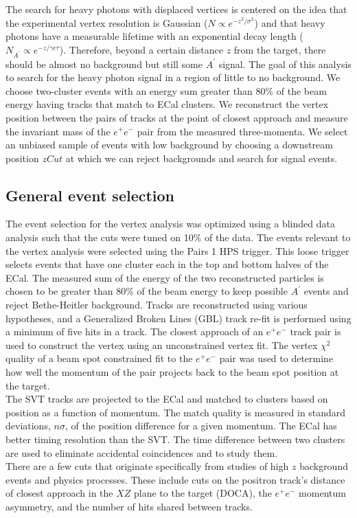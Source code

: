 The search for heavy photons with displaced vertices is centered on the idea that the experimental vertex resolution is Gaussian ($N\propto e^{-z^2/\sigma^2}$) and that heavy photons have a measurable lifetime with an exponential decay length ($N_{A^{\prime}}\propto e^{-z/\gamma c\tau}$). Therefore, beyond a certain distance $z$ from the target, there should be almost no background but still some $A^{\prime}$ signal. The goal of this analysis to search for the heavy photon signal in a region of little to no background. We choose two-cluster events with an energy sum greater than 80$\%$ of the beam energy having tracks that match to ECal clusters. We reconstruct the vertex position between the pairs of tracks at the point of closest approach and measure the invariant mass of the $e^+e^-$ pair from the measured three-momenta. We select an unbiased sample of events with low background by choosing a downstream position $zCut$ at which we can reject backgrounds and search for signal events.\\

\subsection{General event selection}
The event selection for the vertex analysis was optimized using a blinded data analysis such that the cuts were tuned on 10$\%$ of the data. The events relevant to the vertex analysis were selected using the Pairs 1 HPS trigger. This loose trigger selects events that have one cluster each in the top and bottom halves of the ECal. The measured sum of the energy of the two reconstructed particles is chosen to be greater than 80$\%$ of the beam energy to keep possible $A^{\prime}$ events and reject Bethe-Heitler background. Tracks are reconstructed using various hypotheses, and a Generalized Broken Lines (GBL) track re-fit is performed using a minimum of five hits in a track. The closest approach of an $e^+e^-$ track pair is used to construct the vertex using an unconstrained vertex fit. The vertex $\chi^2$ quality of a beam spot constrained fit to the $e^+e^-$ pair was used to determine how well the momentum of the pair projects back to the beam spot position at the target.\\  
\indent The SVT tracks are projected to the ECal and matched to clusters based on position as a function of momentum. The match quality is measured in standard deviations, $n\sigma$, of the position difference for a given momentum. The ECal has better timing resolution than the SVT. The time difference between two clusters are used to eliminate accidental coincidences and to study them. \\
\indent There are a few cuts that originate specifically from studies of high $z$ background events and physics processes. These include cuts on the positron track's distance of closest approach in the $XZ$ plane to the target (DOCA), the $e^+e^-$ momentum asymmetry, and the number of hits shared between tracks. 

